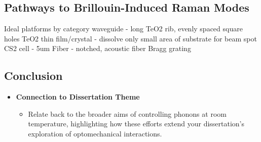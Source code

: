 \subsection{Pathways to Brillouin-Induced Raman Modes}
\label{subsec:Raman:Pathways}
Ideal platforms by category
  waveguide - long TeO2 rib, evenly spaced square holes
  TeO2 thin film/crystal - dissolve only small area of substrate for beam spot
  CS2 cell - 5um
  Fiber - notched, acoustic fiber Bragg grating

\subsection{Conclusion}
\label{subsec:Raman:Conclusion}

\begin{itemize}
\item \textbf{Connection to Dissertation Theme}
  \begin{itemize}
    \item Relate back to the broader aims of controlling phonons at room temperature, highlighting how these efforts extend your dissertation’s exploration of optomechanical interactions.
  \end{itemize}
\end{itemize}

\clearpage
\thispagestyle{empty}
\null
\newpage

